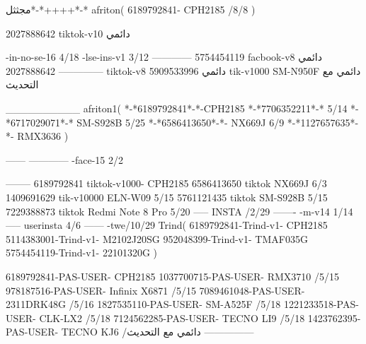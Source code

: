مجثثل*-*++++*-*
afriton(
6189792841- CPH2185  /8/8
)

2027888642 tiktok-v10
دائمي

-in-no-se-16 4/18
-lse-ins-v1 3/12
------------
5754454119 facbook-v8
دائمي
--------------
2027888642 tiktok-v8
دائمي
5909533996 tik-v1000  SM-N950F
دائمي مع التحديث

__________
afriton1(
*-*6189792841*-*-CPH2185
*-*7706352211*-* 5/14
*-*6717029071*-*  SM-S928B 5/25
*-*6586413650*-*- NX669J  6/9
*-*1127657635*-*- RMX3636 \5
)


------
------------
-face-15 2/2

--------
6189792841 tiktok-v1000- CPH2185 
6586413650 tiktok NX669J  6/3
1409691629 tik-v10000 ELN-W09  5/15
5761121435 tiktok SM-S928B   5/15
7229388873 tiktok Redmi Note 8 Pro   5/20
-----
 INSTA /2/29
-------
-m-v14 1/14
-----
userinsta 4/6
------
-twe/10/29
Trind(
6189792841-Trind-v1- CPH2185 
5114383001-Trind-v1- M2102J20SG \5
952048399-Trind-v1- TMAF035G \5
5754454119-Trind-v1- 22101320G \5
)

6189792841-PAS-USER- CPH2185 
1037700715-PAS-USER- RMX3710  /5/15
978187516-PAS-USER- Infinix X6871  /5/15
7089461048-PAS-USER- 2311DRK48G  /5/16
1827535110-PAS-USER- SM-A525F  /5/18
1221233518-PAS-USER-  CLK-LX2  /5/18
7124562285-PAS-USER-  TECNO LI9  /5/18
1423762395-PAS-USER- TECNO KJ6  /دائمي مع التحديث
    ---------------
